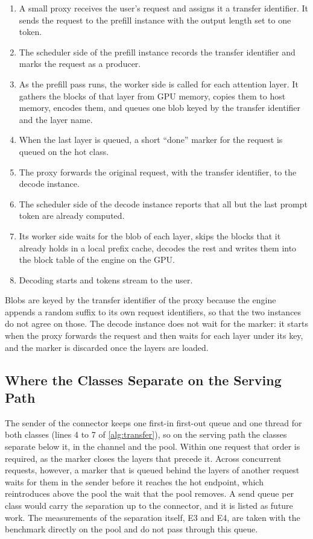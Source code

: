\begin{enumerate}
  \item A small proxy receives the user's request and assigns it a transfer
        identifier. It sends the request to the prefill instance with the
        output length set to one token.
  \item The scheduler side of the prefill instance records the transfer
        identifier and marks the request as a producer.
  \item As the prefill pass runs, the worker side is called for each
        attention layer. It gathers the blocks of that layer from GPU memory,
        copies them to host memory, encodes them, and queues one blob keyed
        by the transfer identifier and the layer name.
  \item When the last layer is queued, a short ``done'' marker for the
        request is queued on the hot class.
  \item The proxy forwards the original request, with the transfer
        identifier, to the decode instance.
  \item The scheduler side of the decode instance reports that all but the
        last prompt token are already computed.
  \item Its worker side waits for the blob of each layer, skips the blocks
        that it already holds in a local prefix cache, decodes the rest and
        writes them into the block table of the engine on the GPU.
  \item Decoding starts and tokens stream to the user.
\end{enumerate}

Blobs are keyed by the transfer identifier of the proxy because the engine
appends a random suffix to its own request identifiers, so that the two
instances do not agree on those. The decode instance does not wait for the
marker: it starts when the proxy forwards the request and then waits for each
layer under its key, and the marker is discarded once the layers are loaded.

\subsection{Where the Classes Separate on the Serving Path}

The sender of the connector keeps one first-in first-out queue and one thread
for both classes (lines 4 to 7 of \cref{alg:transfer}), so on the serving
path the classes separate below it, in the channel and the pool. Within one
request that order is required, as the marker closes the layers that precede
it. Across concurrent requests, however, a marker that is queued behind the
layers of another request waits for them in the sender before it reaches the
hot endpoint, which reintroduces above the pool the wait that the pool
removes. A send queue per class would carry the separation up to the
connector, and it is listed as future work. The
measurements of the separation itself, E3 and E4, are taken with the
benchmark directly on the pool and do not pass through this queue.

